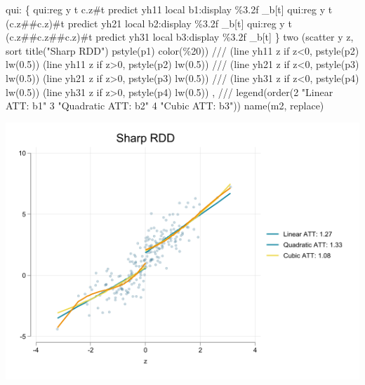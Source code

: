 \documentclass[
  letterpaper,
  DIV=11,
  numbers=noendperiod]{scrartcl}
\newenvironment{Shaded}{\begin{snugshade}}{\end{snugshade}}
\newcommand{\BaseNTok}[1]{\textcolor[rgb]{0.68,0.00,0.00}{#1}}
\newcommand{\CommentTok}[1]{\textcolor[rgb]{0.37,0.37,0.37}{#1}}
\newcommand{\FunctionTok}[1]{\textcolor[rgb]{0.28,0.35,0.67}{#1}}
\newcommand{\KeywordTok}[1]{\textcolor[rgb]{0.00,0.23,0.31}{#1}}
\newcommand{\NormalTok}[1]{\textcolor[rgb]{0.00,0.23,0.31}{#1}}
\newcommand{\StringTok}[1]{\textcolor[rgb]{0.13,0.47,0.30}{#1}}
\begin{document}
\begin{Shaded}
\begin{Highlighting}[]
\KeywordTok{qui}\NormalTok{: \{}
\KeywordTok{qui}\NormalTok{:}\KeywordTok{reg} \FunctionTok{y}\NormalTok{ t c.z\#t }
\KeywordTok{predict}\NormalTok{ yh11}
\KeywordTok{local}\NormalTok{ b1:}\KeywordTok{display}\NormalTok{ \%3.2f \_b[t]}
\KeywordTok{qui}\NormalTok{:}\KeywordTok{reg} \FunctionTok{y}\NormalTok{ t (c.z\#\#c.z)\#t  }
\KeywordTok{predict}\NormalTok{ yh21}
\KeywordTok{local}\NormalTok{ b2:}\KeywordTok{display}\NormalTok{ \%3.2f \_b[t]}
\KeywordTok{qui}\NormalTok{:}\KeywordTok{reg} \FunctionTok{y}\NormalTok{ t (c.z\#\#c.z\#\#c.z)\#t}
\KeywordTok{predict}\NormalTok{ yh31}
\KeywordTok{local}\NormalTok{ b3:}\KeywordTok{display}\NormalTok{ \%3.2f \_b[t]}
\NormalTok{\}}
\KeywordTok{two}\NormalTok{ (}\KeywordTok{scatter} \FunctionTok{y}\NormalTok{ z, }\KeywordTok{sort} \BaseNTok{title}\NormalTok{(}\StringTok{"Sharp RDD"}\NormalTok{) pstyle(p1) }\KeywordTok{color}\NormalTok{(\%20)) }\CommentTok{///}
\NormalTok{    (}\KeywordTok{line}\NormalTok{ yh11 z }\KeywordTok{if}\NormalTok{ z\textless{}0, pstyle(p2) lw(0.5)) (}\KeywordTok{line}\NormalTok{ yh11 z }\KeywordTok{if}\NormalTok{ z\textgreater{}0, pstyle(p2) lw(0.5)) }\CommentTok{///}
\NormalTok{    (}\KeywordTok{line}\NormalTok{ yh21 z }\KeywordTok{if}\NormalTok{ z\textless{}0, pstyle(p3) lw(0.5)) (}\KeywordTok{line}\NormalTok{ yh21 z }\KeywordTok{if}\NormalTok{ z\textgreater{}0, pstyle(p3) lw(0.5)) }\CommentTok{///}
\NormalTok{    (}\KeywordTok{line}\NormalTok{ yh31 z }\KeywordTok{if}\NormalTok{ z\textless{}0, pstyle(p4) lw(0.5)) (}\KeywordTok{line}\NormalTok{ yh31 z }\KeywordTok{if}\NormalTok{ z\textgreater{}0, pstyle(p4) lw(0.5)) , }\CommentTok{///}
    \BaseNTok{legend}\NormalTok{(}\KeywordTok{order}\NormalTok{(2 }\StringTok{"Linear ATT: \textasciigrave{}b1\textquotesingle{}"}\NormalTok{ 3 }\StringTok{"Quadratic ATT: \textasciigrave{}b2\textquotesingle{}"}\NormalTok{ 4 }\StringTok{"Cubic ATT: \textasciigrave{}b3\textquotesingle{}"}\NormalTok{)) }\BaseNTok{name}\NormalTok{(m2, }\KeywordTok{replace}\NormalTok{) }
\end{Highlighting}
\end{Shaded}

\includegraphics{11rdd_files/figure-pdf/cell-4-output-1.png}
\end{document}
